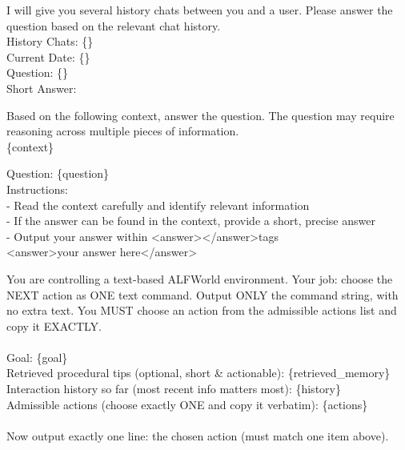 \begin{center}
\begin{tcolorbox}[title={LongMemEval Answer Prompt}]
{
I will give you several history chats between you and a user. Please answer the question based on the relevant chat history. \\
History Chats: \{\} \\
Current Date: \{\} \\
Question: \{\} \\
Short Answer:
}
\label{appendix:case_longmemeval}
\end{tcolorbox}
\end{center}




\begin{center}
\begin{tcolorbox}[title={HotpotQA Answer Prompt}]
{
Based on the following context, answer the question. The question may require reasoning across multiple pieces of information. \\
\{context\}

Question: \{question\} \\

Instructions: \\
- Read the context carefully and identify relevant information \\
- If the answer can be found in the context, provide a short, precise answer \\
- Output your answer within \textless answer\textgreater \textless /answer\textgreater tags \\

\textless answer\textgreater your answer here\textless /answer\textgreater
}
\label{appendix:case_hp}
\end{tcolorbox}
\end{center}




\begin{center}
\begin{tcolorbox}[title={ALFWorld Env Interaction Prompt}]
{
You are controlling a text-based ALFWorld environment. Your job: choose the NEXT action as ONE text command. Output ONLY the command string, with no extra text. You MUST choose an action from the admissible actions list and copy it EXACTLY. \\\\
Goal: \{goal\} \\
Retrieved procedural tips (optional, short \& actionable): \{retrieved\_memory\} \\
Interaction history so far (most recent info matters most): \{history\} \\
Admissible actions (choose exactly ONE and copy it verbatim): \{actions\} \\\\
Now output exactly one line: the chosen action (must match one item above).
}
\label{appendix:case_alfworld}
\end{tcolorbox}
\end{center}








